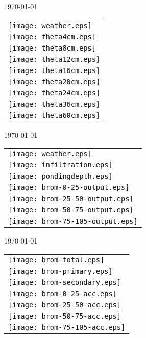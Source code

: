 \documentclass[a4paper]{article}
\begin{document}
\today \\
%
\begin{tabular}{l}
\texttt{[image: weather.eps]} \\
\texttt{[image: theta4cm.eps]} \\
\texttt{[image: theta8cm.eps]} \\
\texttt{[image: theta12cm.eps]} \\
\texttt{[image: theta16cm.eps]} \\
\texttt{[image: theta20cm.eps]} \\
\texttt{[image: theta24cm.eps]} \\
\texttt{[image: theta36cm.eps]} \\
\texttt{[image: theta60cm.eps]}
\end{tabular}

\newpage
\today \\
%
\begin{tabular}{l}
\texttt{[image: weather.eps]} \\
\texttt{[image: infiltration.eps]}\\
\texttt{[image: pondingdepth.eps]}\\
\texttt{[image: brom-0-25-output.eps]} \\
\texttt{[image: brom-25-50-output.eps]} \\
\texttt{[image: brom-50-75-output.eps]} \\
\texttt{[image: brom-75-105-output.eps]}
\end{tabular}

\newpage
\today \\
%
\begin{tabular}{l}
\texttt{[image: brom-total.eps]} \\
\texttt{[image: brom-primary.eps]} \\
\texttt{[image: brom-secondary.eps]} \\
\texttt{[image: brom-0-25-acc.eps]} \\
\texttt{[image: brom-25-50-acc.eps]} \\
\texttt{[image: brom-50-75-acc.eps]} \\
\texttt{[image: brom-75-105-acc.eps]}
\end{tabular}
\end{document}

